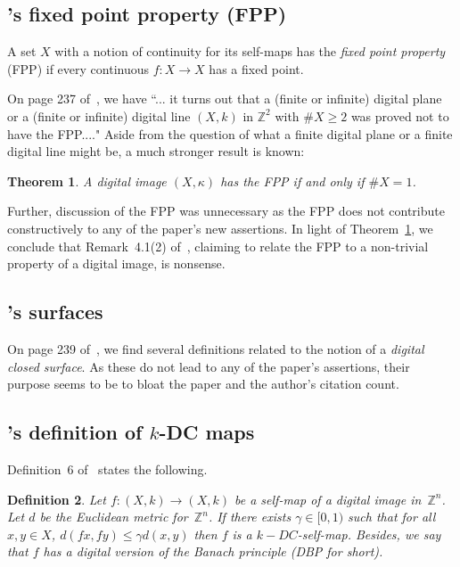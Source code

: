 \documentclass{article}
\newtheorem{thm}{Theorem}
\newtheorem{definition}[thm]{Definition}
\numberwithin{thm}{section}
\def\Z{{\mathbb Z}}
\begin{document}
\subsection{\cite{Han19}'s fixed point property (FPP)}
A set $X$ with a notion of 
continuity for its self-maps has
the {\em fixed point property}
(FPP) if every continuous
$f: X \to X$ has a fixed point.

On page 237 of~\cite{Han19}, we have
``... it turns out that a (finite or infinite) digital
plane or a (finite or infinite) digital line $(X,k)$ 
in $\Z^2$ with $\#X \ge 2$ was proved not to have the FPP...." Aside from the question of what a finite
digital plane or a finite digital line might be,
a much stronger result is known: 
\begin{thm}
\label{FPPcharacterize}
{\rm \cite{BEKLL}}
A digital image
$(X,\kappa)$ has the FPP if and only if 
$\#X = 1$.
\end{thm}

Further, discussion of the
FPP was unnecessary as the
FPP does not contribute 
constructively to any
of the paper's new assertions.
In light of Theorem~\ref{FPPcharacterize},
we conclude that Remark~4.1(2) of~\cite{Han19},
claiming to relate the FPP to
a non-trivial property of a
digital image, is nonsense.

\subsection{\cite{Han19}'s surfaces}
On page 239 of~\cite{Han19}, 
we find several definitions
related to the notion of a
{\em digital closed surface}. 
As these do not lead to any
of the paper's assertions,
their purpose seems to be to
bloat the paper and
the author's citation count.

\subsection{\cite{Han19}'s definition of $k$-DC maps}
Definition~6 of~\cite{Han19} states the following.
\begin{definition}
    \label{Han-kDC}
    Let $f:(X,k) \to (X,k)$ be a self-map of a
    digital image in~$\Z^n$. Let $d$ be the
    Euclidean metric for~$\Z^n$. If there exists
    $\gamma \in [0,1)$ such that for all $x,y \in X$,
    $d(fx,fy) \le \gamma d(x,y)$ then $f$ is a
    $k-DC$-self-map.
    Besides, we say that $f$ has a digital version of the Banach principle (DBP for short).
\end{definition}
\end{document}
